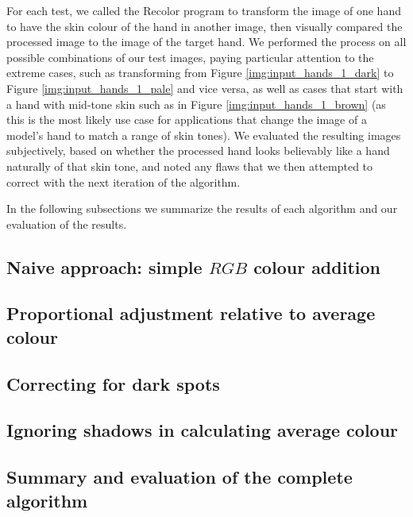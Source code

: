  For each test, we called the Recolor program to transform the image of one hand to have the skin colour of the hand in another image, then visually compared the processed image to the image of the target hand. We performed the process on all possible combinations of our test images, paying particular attention to the extreme cases, such as transforming from Figure \ref{img:input_hands_1_dark} to Figure \ref{img:input_hands_1_pale} and vice versa, as well as cases that start with a hand with mid-tone skin such as in Figure \ref{img:input_hands_1_brown} (as this is the most likely use case for applications that change the image of a model's hand to match a range of skin tones). We evaluated the resulting images subjectively, based on whether the processed hand looks believably like a hand naturally of that skin tone, and noted any flaws that we then attempted to correct with the next iteration of the algorithm.

In the following subsections we summarize the results of each algorithm and our evaluation of the results.

\subsection{Naive approach: simple $RGB$ colour addition}


\subsection{Proportional adjustment relative to average colour} \label{sec:algo_prop_eval}
 

\subsection{Correcting for dark spots}


\subsection{Ignoring shadows in calculating average colour}

\pagebreak

\subsection{Summary and evaluation of the complete algorithm}
